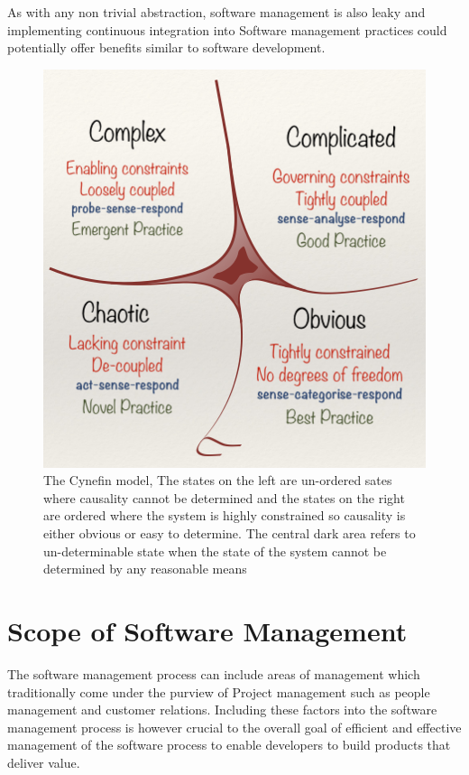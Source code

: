 \documentclass[12pt,conference]{IEEEtran}
\begin{document}
As with any non trivial abstraction, software management is also leaky and implementing continuous integration into Software management practices could potentially offer benefits similar to software development.

\begin{figure}[hbtp]
\includegraphics[scale=0.55]{cynefin.png}
\caption{The Cynefin model, The states on the left are un-ordered sates where causality cannot be determined and the states on the right are ordered where the system is highly constrained so causality is either obvious or easy to determine. The central dark area refers to un-determinable state when the state of the system cannot be determined by any reasonable means  \cite{snowden_leaders_2007}}
\label{cynefin}
\end{figure}



\section*{Scope of Software Management}

The software management process can include areas of management which traditionally come under the purview of Project management such as people management and customer relations. Including these factors into the software management process is however crucial to the overall goal of efficient and effective management of the software process to enable developers to build products that deliver value.
\end{document}
